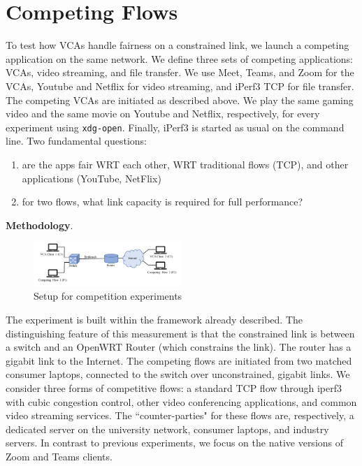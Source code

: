 \section{Competing Flows}
To test how VCAs handle fairness on a constrained link, we launch a competing application on the same network. We define three sets of competing applications: VCAs, video streaming, and file transfer. We use Meet, Teams, and Zoom for the VCAs, Youtube and Netflix for video streaming, and iPerf3 TCP for file transfer. The competing VCAs are initiated as described above. We play the same gaming video and the same movie on Youtube and Netflix, respectively, for every experiment using \texttt{xdg-open}. Finally, iPerf3 is started as usual on the command line.
Two fundamental questions:
\begin{enumerate}
    \item are the apps fair WRT each other, WRT traditional flows (TCP), and other applications (YouTube, NetFlix)
    \item for two flows, what link capacity is required for full performance?
\end{enumerate}


\noindent \textbf{Methodology}.
\begin{center}
   \begin{figure}[]
    \includegraphics[width=0.5\textwidth,keepaspectratio]{../figures/methodology/competition-setup.pdf}
    \caption{Setup for competition experiments
    }
    \label{fig:loss_latency}
\end{figure}
 
\end{center}

The experiment is built within the framework already described.
The distinguishing feature of this measurement is that the 
  constrained link is between a switch and an OpenWRT Router 
    (which constrains the link).
The router has a gigabit link to the Internet.
The competing flows are initiated from two matched consumer laptops,
  connected to the switch over unconstrained, gigabit links.
We consider three forms of competitive flows:
  a standard TCP flow through iperf3 with cubic congestion control,
  other video conferencing applications, and 
  common video streaming services.
The ``counter-parties" for these flows are, respectively,
  a dedicated server on the university network,
  consumer laptops, and industry servers.
In contrast to previous experiments, 
  we focus on the native versions of Zoom and Teams clients.

